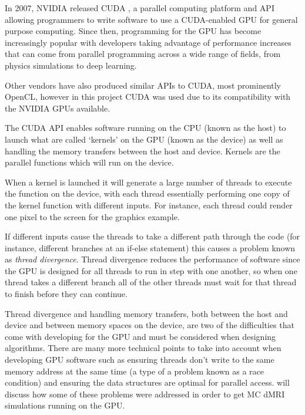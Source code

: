 In 2007, NVIDIA released \ac{CUDA} \cite{Nickolls2008}, a parallel computing platform and \ac{API} allowing programmers to write software to use a \ac{CUDA}-enabled \ac{GPU} for general purpose computing.
Since then, programming for the \ac{GPU} has become increasingly popular with developers taking advantage of performance increases that can come from parallel programming across a wide range of fields, from physics simulations to deep learning. 

Other vendors have also produced similar \acp{API} to \ac{CUDA}, most prominently OpenCL\cite{Stone2010}, however in this project \ac{CUDA} was used due to its compatibility with the NVIDIA \acp{GPU} available.

The \ac{CUDA} \ac{API} enables software running on the \ac{CPU} (known as the host) to launch what are called `kernels' on the \ac{GPU} (known as the device) as well as handling the memory transfers between the host and device. Kernels are the parallel functions which will run on the device.

When a kernel is launched it will generate a large number of threads to execute the function on the device, with each thread essentially performing one copy of the kernel function with different inputs.
For instance, each thread could render one pixel to the screen for the graphics example.

If different inputs cause the threads to take a different path through the code (for instance, different branches at an if-else statement) this causes a problem known as \emph{thread divergence}.
Thread divergence reduces the performance of software since the \ac{GPU} is designed for all threads to run in step with one another, so when one thread takes a different branch all of the other threads must wait for that thread to finish before they can continue. 

Thread divergence and handling memory transfers, both between the host and device and between memory spaces on the device, are two of the difficulties that come with developing for the \ac{GPU} and must be considered when designing algorithms.  
There are many more technical points to take into account when developing \ac{GPU} software such as ensuring threads don't write to the same memory address at the same time (a type of a problem known as a race condition) and ensuring the data structures are optimal for parallel access.
 will discuss how some of these problems were addressed in order to get \ac{MC} \ac{dMRI} simulations running on the \ac{GPU}. 



